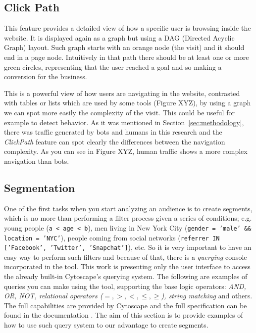 \documentclass[preprint,12pt,3p]{elsarticle}
\begin{document}
\subsection{Click Path}
This feature provides a detailed view of how a specific user is browsing inside the website. It is displayed again as a graph but using a DAG (Directed Acyclic Graph) \cite{} layout. Such graph starts with an orange node (the visit) and it should end in a page node.
Intuitively in that path there should be at least one or more green circles, representing that the user reached a goal and so making a conversion for the business.

This is a powerful view of how users are navigating in the website, contrasted with tables or lists which are used by some tools (Figure XYZ), by using a graph we can spot more easily the complexity of the visit.
This could be useful for example to detect behavior. As it was mentioned in Section~\ref{sec:methodology}, there was traffic generated by bots and humans in this research and the \textit{ClickPath} feature can spot clearly the differences between the navigation complexity. As you can see in Figure XYZ, human traffic shows a more complex navigation than bots.


\subsection{Segmentation}
One of the first tasks when you start analyzing an audience is to create segments, which is no more than performing a filter process given a series of conditions;
e.g. young people (\texttt{a < age < b}), men living in New York City (\texttt{gender = 'male' \&\& location = 'NYC'}), people coming from social networks (\texttt{referrer IN ['Facebook', 'Twitter', 'Snapchat']}), etc. So it is very important to have an easy way to perform such filters and because of that, there is a \textit{querying} console incorporated in the tool. This work is presenting only the user interface to access the already built-in Cytoscape's querying system.
The following are examples of queries you can make using the tool, supporting the base logic operators: \textit{AND, OR, NOT, relational operators ($=, >, <, \leq, \geq$), string matching} and others. The full capabilities are provided by Cytoscape and the full specification can be found in the documentation \cite{}. The aim of this section is to provide examples of how to use such query system to our advantage to create segments.
\end{document}
